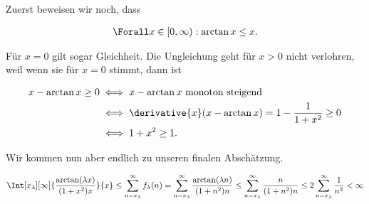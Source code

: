 \begin{solution}
\begin{enumerate}[label = \arabic*.]
    Zuerst beweisen wir noch, dass

    \begin{align*}
        \Forall x \in [0, \infty): \arctan x \leq x.
    \end{align*}

    Für $x = 0$ gilt sogar Gleichheit.
    Die Ungleichung geht für $x > 0$ nicht verlohren, weil wenn sie für $x = 0$ stimmt, dann ist

    \begin{align*}
        x - \arctan x \geq 0
        & \iff
        x - \arctan x ~\text{monoton steigend}~ \\
        & \iff
        \derivative{x}
        (x - \arctan x)
        =
        1 - \frac{1}{1 + x^2}
        \geq
        0 \\
        & \iff
        1 + x^2 \geq 1.
    \end{align*}

    Wir kommen nun aber endlich zu unseren finalen Abschätzung.

    \begin{align*}
        \Int[x_\lambda][\infty]
        {
            \frac
            {
                \arctan(\lambda x)
            }{
                (1 + x^2) x
            }
        }{x}
        \leq
        \sum_{n = x_\lambda}^\infty
        f_\lambda(n)
        =
        \sum_{n = x_\lambda}^\infty
        \frac
        {
            \arctan(\lambda n)
        }{
            (1 + n^2) n
        }
        \leq
        \sum_{n = x_\lambda}^\infty
        \frac{n}
        {
            (1 + n^2) n
        }
        \leq
        2
        \sum_{n = x_\lambda}^\infty
        \frac{1}{n^2}
        <
        \infty
    \end{align*}

\end{enumerate}

\end{solution}

